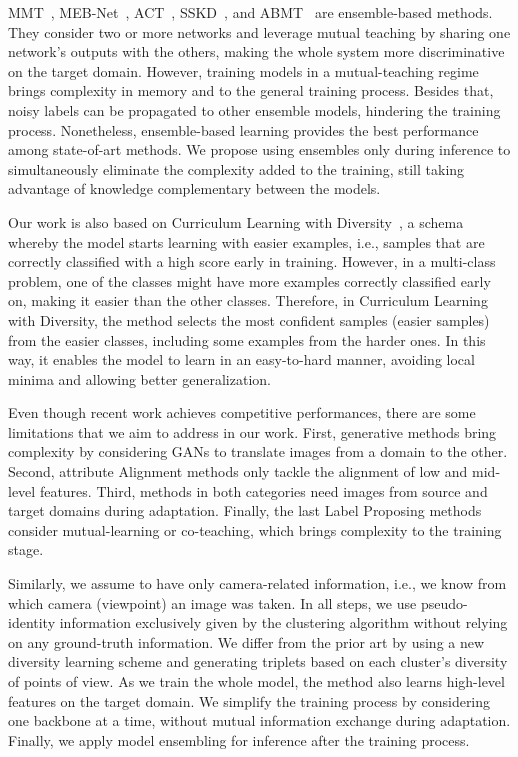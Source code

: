 \documentclass[journal]{IEEEtran}
\begin{document}
MMT~\cite{ge2020mutual}, MEB-Net~\cite{zhai2020multiple}, ACT~\cite{yang2020asymmetric}, SSKD~\cite{yin2020sskd}, and ABMT~\cite{chen2020enhancing} are ensemble-based methods. They consider two or more networks and leverage mutual teaching by sharing one network's outputs with the others, making the whole system more discriminative on the target domain. However, training models in a mutual-teaching regime brings complexity in memory and to the general training process. Besides that, noisy labels can be propagated to other ensemble models, hindering the training process. Nonetheless, ensemble-based learning provides the best performance among state-of-art methods. We propose using ensembles only during inference to simultaneously eliminate the complexity added to the training, still taking advantage of knowledge complementary between the models. 

Our work is also based on Curriculum Learning with Diversity~\cite{jiang2014self}, a schema whereby the model starts learning with easier examples, i.e., samples that are correctly classified with a high score early in training. However, in a multi-class problem, one of the classes might have more examples correctly classified early on, making it easier than the other classes. Therefore, in Curriculum Learning with Diversity, the method selects the most confident samples (easier samples) from the easier classes, including some examples from the harder ones. In this way, it enables the model to learn in an easy-to-hard manner, avoiding local minima and allowing better generalization.

Even though recent work achieves competitive performances, there are some limitations that we aim to address in our work. First, generative methods bring complexity by considering GANs to translate images from a domain to the other. Second, attribute Alignment methods only tackle the alignment of low and mid-level features. Third, methods in both categories need images from source and target domains during adaptation. Finally, the last Label Proposing methods consider mutual-learning or co-teaching, which brings complexity to the training stage.

Similarly, we assume to have only camera-related information, i.e., we know from which camera (viewpoint) an image was taken. In all steps, we use pseudo-identity information exclusively given by the clustering algorithm without relying on any ground-truth information. We differ from the prior art by using a new diversity learning scheme and generating triplets based on each cluster's diversity of points of view. As we train the whole model, the method also learns high-level features on the target domain. We simplify the training process by considering one backbone at a time, without mutual information exchange during adaptation. Finally, we apply model ensembling for inference after the training process.
\end{document}
